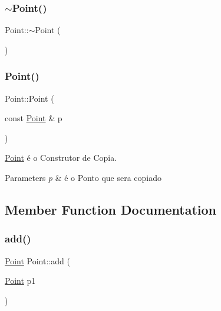 \subsubsection{\texorpdfstring{$\sim$\+Point()}{~Point()}}
{\footnotesize\ttfamily Point\+::$\sim$\+Point (\begin{DoxyParamCaption}{ }\end{DoxyParamCaption})}

\mbox{\label{class_point_af0c0f20db1616447bc78184ed537ef6e}} 
\subsubsection{\texorpdfstring{Point()}{Point()}\hspace{0.1cm}{\footnotesize\ttfamily [2/2]}}
{\footnotesize\ttfamily Point\+::\+Point (\begin{DoxyParamCaption}\item[{const \mbox{\hyperlink{class_point}{Point}} \&}]{p }\end{DoxyParamCaption})}



\mbox{\hyperlink{class_point}{Point}} é o Construtor de Copia. 


\begin{DoxyParams}{Parameters}
{\em p} & é o Ponto que sera copiado \\
\hline
\end{DoxyParams}


\subsection{Member Function Documentation}
\mbox{\label{class_point_a9dbea84b07b0a8ec3bbb9e58b3d15899}} 
\subsubsection{\texorpdfstring{add()}{add()}}
{\footnotesize\ttfamily \mbox{\hyperlink{class_point}{Point}} Point\+::add (\begin{DoxyParamCaption}\item[{\mbox{\hyperlink{class_point}{Point}}}]{p1 }\end{DoxyParamCaption})}



